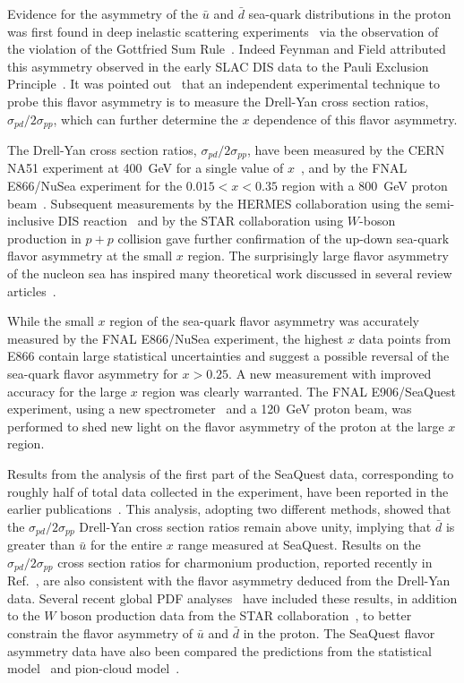 \documentclass[reprint,aps,unsortedaddress,superscriptaddress,prl,floatfix,showpacs,linenumbers]{revtex4-2}
\begin{document}
Evidence for the asymmetry of the $\bar{u}$ and $\bar{d}$ sea-quark
distributions in the proton was first found in
deep inelastic scattering experiments~\cite{stein1975,amaudruz1991} via
the observation of the violation
of the Gottfried Sum Rule~\cite{gottfried1967}. Indeed Feynman and Field
attributed this asymmetry observed in the early SLAC DIS data to the Pauli
Exclusion Principle~\cite{field1977}. It was pointed out~\cite{ellis1991}
that an independent experimental technique to probe this flavor asymmetry is
to measure the Drell-Yan cross section ratios,
$\sigma_{pd}/2\sigma_{pp}$, which can further determine the $x$ dependence
of this flavor asymmetry.

The Drell-Yan cross section ratios,
$\sigma_{pd}/2\sigma_{pp}$, have been measured by the CERN NA51 experiment at
\SI{400}{\GeV} for a single value of $x$~\cite{NA51:1994xrz}, and by the FNAL
E866/NuSea experiment for the $0.015 < x < 0.35$ region with a \SI{800}{\GeV}
proton beam~\cite{hawker1998,peng1998,towell2001}. Subsequent measurements by the
HERMES collaboration using the semi-inclusive DIS reaction~\cite{ackerstaff1998}
and by the STAR collaboration using $W$-boson production in $p+p$ collision
gave further confirmation of the up-down sea-quark flavor asymmetry at
the small $x$ region. The surprisingly large flavor asymmetry of the nucleon
sea has inspired many theoretical work discussed in several review
articles~\cite{kumano1998,vogt2000a,garvey2001,chang2014}.

While the small $x$ region of the sea-quark flavor asymmetry was accurately
measured by the FNAL E866/NuSea experiment, the highest $x$ data points from
E866 contain large statistical uncertainties and suggest a possible reversal of
the sea-quark flavor asymmetry for $x > 0.25$. A new measurement with improved
accuracy for the large $x$ region was clearly warranted. The FNAL
E906/SeaQuest experiment, using a new spectrometer~\cite{aidala2019} and
a \SI{120}{\GeV} proton beam, was performed to shed new light on the flavor asymmetry
of the proton at the large $x$ region.

Results from the analysis of the first part of the SeaQuest data, corresponding
to roughly half of total data collected in the experiment, have been reported
in the earlier publications~\cite{dove2021,dove2023}.
This analysis, adopting two different methods, showed that the
$\sigma_{pd}/2\sigma_{pp}$ Drell-Yan cross section ratios remain
above unity, implying that
$\bar{d}$ is greater than $\bar{u}$ for the entire $x$ range measured
at SeaQuest. Results on the $\sigma_{pd}/2\sigma_{pp}$  cross section ratios
for charmonium production, reported recently in
Ref.~\cite{leung2024a}, are also consistent with the flavor asymmetry
deduced from the Drell-Yan data.
Several recent global PDF
analyses~\cite{cocuzza2021,ball2022a,accardi2023,alekhin2023}
have included these results, in addition to the $W$ boson production data
from the STAR collaboration~\cite{adam2021}, to better constrain the
flavor asymmetry of $\bar u$ and $\bar d$ in the proton. The SeaQuest
flavor asymmetry data have also been compared the predictions from the
statistical model~\cite{soffer2019} and pion-cloud model~\cite{alberg2022}.
\end{document}
